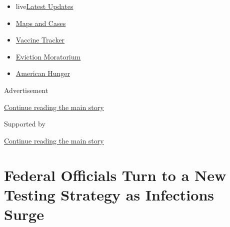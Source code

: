 \begin{itemize}
\tightlist
\item
  live\href{https://www.nytimes3xbfgragh.onion/2020/09/08/world/covid-19-coronavirus.html?name=styln-coronavirus-national\&region=TOP_BANNER\&block=storyline_menu_recirc\&action=click\&pgtype=Article\&impression_id=2e58a6e1-f1c3-11ea-8a7f-39e977841eba\&variant=undefined}{Latest
  Updates}
\item
  \href{https://www.nytimes3xbfgragh.onion/interactive/2020/us/coronavirus-us-cases.html?name=styln-coronavirus-national\&region=TOP_BANNER\&block=storyline_menu_recirc\&action=click\&pgtype=Article\&impression_id=2e58a6e2-f1c3-11ea-8a7f-39e977841eba\&variant=undefined}{Maps
  and Cases}
\item
  \href{https://www.nytimes3xbfgragh.onion/interactive/2020/science/coronavirus-vaccine-tracker.html?name=styln-coronavirus-national\&region=TOP_BANNER\&block=storyline_menu_recirc\&action=click\&pgtype=Article\&impression_id=2e58a6e3-f1c3-11ea-8a7f-39e977841eba\&variant=undefined}{Vaccine
  Tracker}
\item
  \href{https://www.nytimes3xbfgragh.onion/2020/09/02/your-money/eviction-moratorium-covid.html?name=styln-coronavirus-national\&region=TOP_BANNER\&block=storyline_menu_recirc\&action=click\&pgtype=Article\&impression_id=2e58cdf0-f1c3-11ea-8a7f-39e977841eba\&variant=undefined}{Eviction
  Moratorium}
\item
  \href{https://www.nytimes3xbfgragh.onion/interactive/2020/09/02/magazine/food-insecurity-hunger-us.html?name=styln-coronavirus-national\&region=TOP_BANNER\&block=storyline_menu_recirc\&action=click\&pgtype=Article\&impression_id=2e58cdf1-f1c3-11ea-8a7f-39e977841eba\&variant=undefined}{American
  Hunger}
\end{itemize}

Advertisement

\protect\hyperlink{after-top}{Continue reading the main story}

Supported by

\protect\hyperlink{after-sponsor}{Continue reading the main story}

\hypertarget{federal-officials-turn-to-a-new-testing-strategy-as-infections-surge}{%
\section{Federal Officials Turn to a New Testing Strategy as Infections
Surge}\label{federal-officials-turn-to-a-new-testing-strategy-as-infections-surge}}

